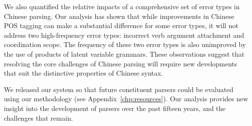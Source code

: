 We also quantified the relative impacts of a comprehensive set of error types
in Chinese parsing.  Our analysis has shown that while improvements in
Chinese POS tagging can make a substantial difference for some error types,
it will not address two high-frequency error types: incorrect verb argument
attachment and coordination scope.  The frequency of these two error types is
also unimproved by the use of products of latent variable grammars.  These
observations suggest that resolving the core challenges of Chinese parsing
will require new developments that suit the distinctive properties of Chinese
syntax.

We released our system so that future constituent parsers could be evaluated using our methodology (see Appendix~\ref{chp:resources}).
Our analysis provides new insight into the development of parsers over the past fifteen years, and the challenges that remain.

